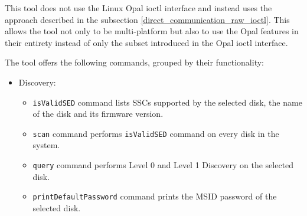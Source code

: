This tool does not use the Linux Opal ioctl interface and instead uses the approach described in the subsection \ref{direct_communication_raw_ioctl}. This allows the tool not only to be multi-platform but also to use the Opal features in their entirety instead of only the subset introduced in the Opal ioctl interface.

The tool offers the following commands, grouped by their functionality:
\begin{itemize}
    \item Discovery: \begin{itemize}
\item \verb|isValidSED| command lists SSCs supported by the selected disk, the name of the disk and its firmware version.
\item \verb|scan| command performs \verb|isValidSED| command on every disk in the system.
\item \verb|query| command performs Level 0 and Level 1 Discovery on the selected disk.
\item \verb|printDefaultPassword| command prints the MSID password of the selected disk.
    \end{itemize}
    
    

\end{itemize}

